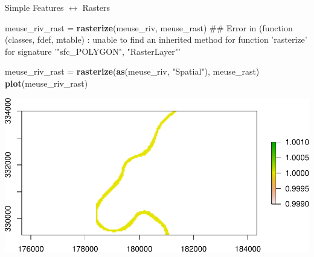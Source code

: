 \documentclass[11pt,ignorenonframetext,]{beamer}
\newenvironment{Shaded}{}{}
\newcommand{\KeywordTok}[1]{\textcolor[rgb]{0.00,0.44,0.13}{\textbf{#1}}}
\newcommand{\NormalTok}[1]{#1}
\newcommand{\StringTok}[1]{\textcolor[rgb]{0.25,0.44,0.63}{#1}}
\let\oldShaded\Shaded
\let\endoldShaded\endShaded
\renewenvironment{Shaded}{\footnotesize\begin{spacing}{0.9}\oldShaded}{\endoldShaded\end{spacing}}
\let\oldverbatim\verbatim
\let\endoldverbatim\endverbatim
\newcommand{\scriptoutput}{
  \renewenvironment{Shaded}{\scriptsize\begin{spacing}{0.9}\oldShaded}{\endoldShaded\end{spacing}}
  \renewenvironment{verbatim}{\scriptsize\begin{spacing}{0.9}\oldverbatim}{\endoldverbatim\end{spacing}}
}
\begin{document}
\begin{frame}[fragile,t]{Simple Features \(\longleftrightarrow\)
Rasters}
\protect\hypertarget{simple-features-longleftrightarrow-rasters}{}

\scriptoutput

\begin{Shaded}
\begin{Highlighting}[]
\NormalTok{meuse_riv_rast =}\StringTok{ }\KeywordTok{rasterize}\NormalTok{(meuse_riv, meuse_rast)}
\NormalTok{## Error in (function (classes, fdef, mtable) : unable to find an inherited method for function 'rasterize' for signature '"sfc_POLYGON", "RasterLayer"'}

\NormalTok{meuse_riv_rast =}\StringTok{ }\KeywordTok{rasterize}\NormalTok{(}\KeywordTok{as}\NormalTok{(meuse_riv, }\StringTok{"Spatial"}\NormalTok{), meuse_rast)}
\KeywordTok{plot}\NormalTok{(meuse_riv_rast)}
\end{Highlighting}
\end{Shaded}

\begin{center}\includegraphics[width=\textwidth]{Lec16_files/figure-beamer/unnamed-chunk-46-1} \end{center}

\end{frame}
\end{document}
